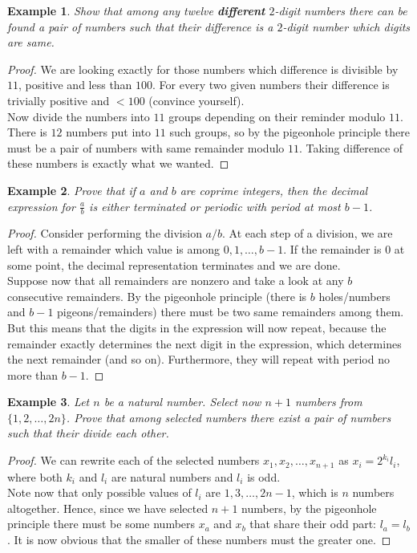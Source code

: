 \documentclass[12pt,a4paper]{article}
\newtheorem{theorem}{Example}
\begin{document}
\begin{theorem}
Show that among any twelve \textbf{different} $2$-digit numbers there can be found a pair of numbers such that their difference is a $2$-digit number which digits are same.
\end{theorem}
\begin{proof}
We are looking exactly for those numbers which difference is divisible by $11$, positive and less than $100$. For every two given numbers their difference is trivially positive and $<100$ (convince yourself).\\
Now divide the numbers into $11$ groups depending on their reminder modulo $11$. There is $12$ numbers put into $11$ such groups, so by the pigeonhole principle there must be a pair of numbers with same remainder modulo $11$. Taking difference of these numbers is exactly what we wanted.
\end{proof}

\begin{theorem}
Prove that if $a$ and $b$ are coprime integers, then the decimal expression for $\frac{a}{b}$ is either terminated or periodic with period at most $b - 1$. 
\end{theorem}
\begin{proof}
Consider performing the division $a/b$. At each step of a division, we are left with a remainder which value is among $0,1,\dots,b-1$. If the remainder is $0$ at some point, the decimal representation terminates and we are done. \\
Suppose now that all remainders are nonzero and take a look at any $b$ consecutive remainders. By the pigeonhole principle (there is $b$ holes/numbers and $b-1$ pigeons/remainders) there must be two same remainders among them. \\
But this means that the digits in the expression will now repeat, because the remainder exactly determines the next digit in the expression, which determines the next remainder (and so on). Furthermore, they will repeat with period no more than $b - 1$.
\end{proof}

\begin{theorem}
Let $n$ be a natural number. Select now $n + 1$ numbers from  $\{1,2,\dots,2n\}$. Prove that among selected numbers there exist a pair of numbers such that their divide each other.
\end{theorem}
\begin{proof}
We can rewrite each of the selected numbers $x_{1}, x_{2}, \dots,x_{n+1}$ as $x_{i} = 2^{k_{i}}l_{i}$, where both $k_{i}$ and $l_{i}$ are natural numbers and  $l_{i}$ is odd. \\
Note now that only possible values of $l_{i}$ are $1,3,\dots,2n - 1$, which is $n$ numbers altogether. Hence, since we have selected $n+1$ numbers, by the pigeonhole principle there must be some numbers $x_{a}$ and $x_{b}$ that share their odd part: $l_{a} = l_{b}$. It is now obvious that the smaller of these numbers must the greater one.
\end{proof}
\end{document}
